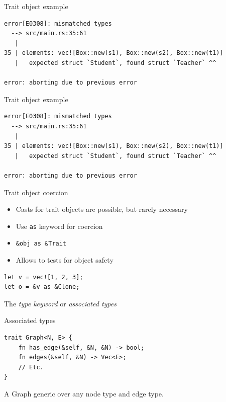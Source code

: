 \documentclass{beamer}
\begin{document}
\begin{frame}[fragile]{Trait object example}
  \begin{verbatim}
error[E0308]: mismatched types
  --> src/main.rs:35:61
   |
35 | elements: vec![Box::new(s1), Box::new(s2), Box::new(t1)]
   |   expected struct `Student`, found struct `Teacher` ^^

error: aborting due to previous error
  \end{verbatim}
\end{frame}

\begin{frame}[fragile]{Trait object example}
  \begin{verbatim}
error[E0308]: mismatched types
  --> src/main.rs:35:61
   |
35 | elements: vec![Box::new(s1), Box::new(s2), Box::new(t1)]
   |   expected struct `Student`, found struct `Teacher` ^^

error: aborting due to previous error
  \end{verbatim}
\end{frame}

\begin{frame}[fragile]{Trait object coercion}
  \begin{itemize}
    \item Casts for trait objects are possible, but rarely necessary
    \item Use \texttt{as} keyword for coercion
    \item \texttt{&obj as &Trait}
    \item Allows to tests for object safety
  \end{itemize}
  \begin{verbatim}
let v = vec![1, 2, 3];
let o = &v as &Clone;
  \end{verbatim}
\end{frame}

\begin{frame}[standout]
  The \emph{type keyword} or \emph{associated types}
\end{frame}

\begin{frame}[fragile]{Associated types}
  \begin{verbatim}
trait Graph<N, E> {
    fn has_edge(&self, &N, &N) -> bool;
    fn edges(&self, &N) -> Vec<E>;
    // Etc.
}
  \end{verbatim}
  A Graph generic over any node type and edge type.
\end{frame}
\end{document}
